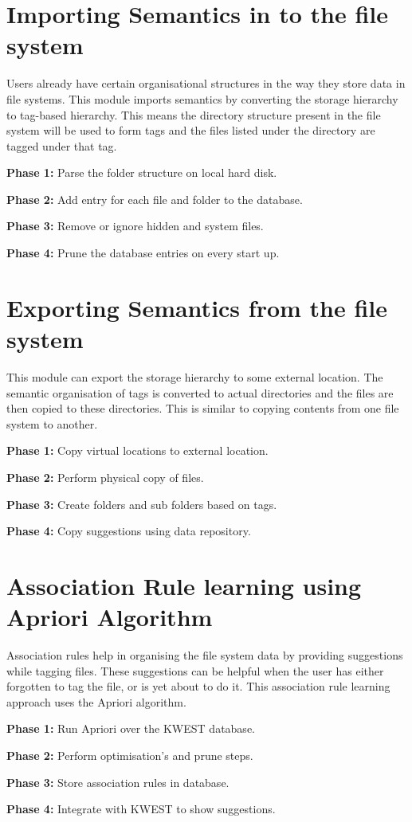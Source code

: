 \section{Importing Semantics in to the file system}
Users already have certain organisational structures in the way they store data in file systems. This module imports semantics by converting the storage hierarchy to tag-based hierarchy. This means the directory structure present in the file system will be used to form tags and the files listed under the directory are tagged under that tag.
\begin{list}{•}{•}
\item \textbf{Phase 1:} Parse the folder structure on local hard disk.
\item \textbf{Phase 2:} Add entry for each file and folder to the database.
\item \textbf{Phase 3:} Remove or ignore hidden and system files.
\item \textbf{Phase 4:} Prune the database entries on every start up.
\end{list}
\newpage
\section{Exporting Semantics from the file system}
This module can export the storage hierarchy to some external location. The semantic organisation of tags is converted to actual directories and the files are then copied to these directories. This is similar to copying contents from one file system to another.
\begin{list}{•}{•}
\item \textbf{Phase 1:} Copy virtual locations to external location.
\item \textbf{Phase 2:} Perform physical copy of files.
\item \textbf{Phase 3:} Create folders and sub folders based on tags.
\item \textbf{Phase 4:} Copy suggestions using data repository.
\end{list}

\section{Association Rule learning using Apriori Algorithm}
Association rules help in organising the file system data by providing suggestions while tagging files. These suggestions can be helpful when the user has either forgotten to tag the file, or is yet about to do it. This association rule learning approach uses the Apriori algorithm.
\begin{list}{•}{•}
\item \textbf{Phase 1:} Run Apriori over the KWEST database.
\item \textbf{Phase 2:} Perform optimisation's and prune steps.
\item \textbf{Phase 3:} Store association rules in database.
\item \textbf{Phase 4:} Integrate with KWEST to show suggestions.
\end{list}
